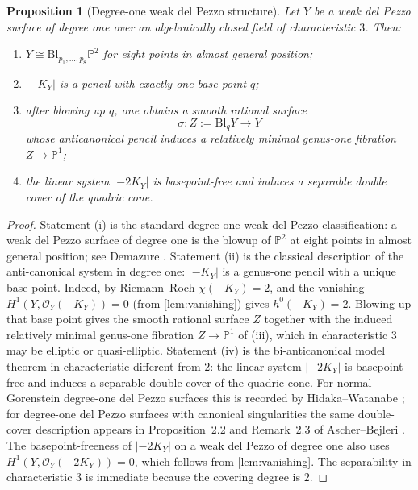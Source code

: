 \documentclass[11pt]{article}
\newtheorem{proposition}[proposition]{Proposition}
\theoremstyle{definition}
\newcommand{\Pbb}{\mathbb P}
\newcommand{\Bl}{\mathrm{Bl}}
\begin{document}
\begin{proposition}[Degree-one weak del Pezzo structure]\label{prop:deg1-weak-dp}
Let $Y$ be a weak del Pezzo surface of degree one over an algebraically closed field of characteristic $3$. Then:
\begin{enumerate}[label=\textup{(\roman*)}]
\item $Y\cong \Bl_{p_1,\dots,p_8}\Pbb^2$ for eight points in almost general position;
\item $|-K_Y|$ is a pencil with exactly one base point $q$;
\item after blowing up $q$, one obtains a smooth rational surface
\[
\sigma\colon Z:=\Bl_qY\to Y
\]
whose anticanonical pencil induces a relatively minimal genus-one fibration $Z\to\Pbb^1$;
\item the linear system $|-2K_Y|$ is basepoint-free and induces a separable double cover of the quadric cone.
\end{enumerate}
\end{proposition}

\begin{proof}
Statement (i) is the standard degree-one weak-del-Pezzo classification: a weak del Pezzo surface of degree one is the blowup of $\Pbb^2$ at eight points in almost general position; see Demazure \cite{Demazure80}. Statement (ii) is the classical description of the anti-canonical system in degree one: $|-K_Y|$ is a genus-one pencil with a unique base point. Indeed, by Riemann--Roch $\chi(-K_Y)=2$, and the vanishing $H^1(Y,\mathcal O_Y(-K_Y))=0$ (from \cref{lem:vanishing}) gives $h^0(-K_Y)=2$. Blowing up that base point gives the smooth rational surface $Z$ together with the induced relatively minimal genus-one fibration $Z\to\Pbb^1$ of (iii), which in characteristic $3$ may be elliptic or quasi-elliptic. Statement (iv) is the bi-anticanonical model theorem in characteristic different from $2$: the linear system $|-2K_Y|$ is basepoint-free and induces a separable double cover of the quadric cone. For normal Gorenstein degree-one del Pezzo surfaces this is recorded by Hidaka--Watanabe \cite{HW81}; for degree-one del Pezzo surfaces with canonical singularities the same double-cover description appears in Proposition~2.2 and Remark~2.3 of Ascher--Bejleri \cite{AscherBejleri21}. The basepoint-freeness of $|-2K_Y|$ on a weak del Pezzo of degree one also uses $H^1(Y,\mathcal O_Y(-2K_Y))=0$, which follows from \cref{lem:vanishing}. The separability in characteristic $3$ is immediate because the covering degree is $2$.
\end{proof}
\end{document}

